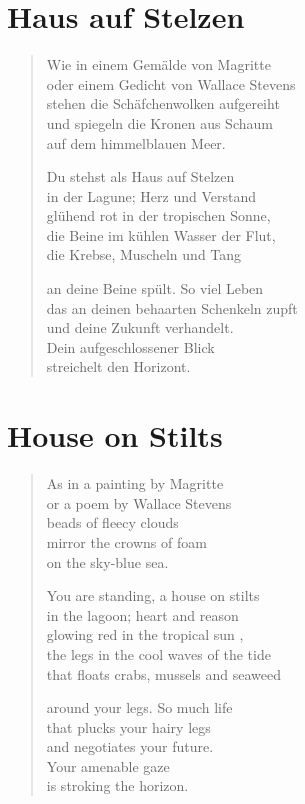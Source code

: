
\cleartoverso

\section{Haus auf Stelzen}

\begin{verse}

Wie in einem Gemälde von Magritte\\
oder einem Gedicht von Wallace Stevens\\
stehen die Schäfchenwolken aufgereiht\\
und spiegeln die Kronen aus Schaum\\
auf dem himmelblauen Meer.

Du stehst als Haus auf Stelzen\\
in der Lagune; Herz und Verstand\\
glühend rot in der tropischen Sonne,\\
die Beine im kühlen Wasser der Flut,\\
die Krebse, Muscheln und Tang

an deine Beine spült. So viel Leben\\
das an deinen behaarten Schenkeln zupft\\
und deine Zukunft verhandelt.\\
Dein aufgeschlossener Blick\\
streichelt den Horizont.

\end{verse}

\clearpage

\section{House on Stilts}

\begin{verse}

As in a painting by Magritte\\
or a poem by Wallace Stevens\\
beads of fleecy clouds\\
mirror the crowns of foam\\
on the sky-blue sea.

You are standing, a house on stilts\\
in the lagoon; heart and reason\\
glowing red in the tropical sun ,\\
the legs in the cool waves of the tide\\
that floats crabs, mussels and seaweed

around your legs. So much life\\
that plucks your hairy legs\\
and negotiates your future.\\
Your amenable gaze\\
is stroking the horizon.

\end{verse}
